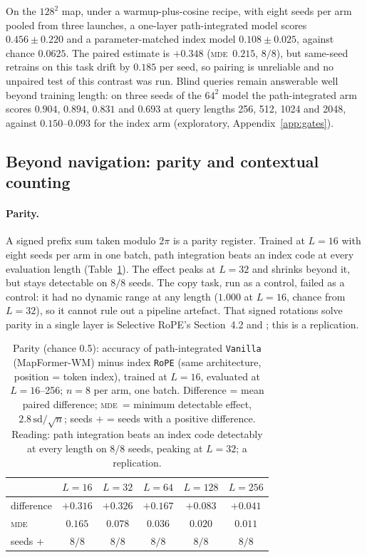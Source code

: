 \documentclass[10pt]{article}
\newcommand{\mde}{\textsc{mde}}
\newcommand{\arm}[1]{\texttt{#1}}
\begin{document}
On the $128^2$ map, under a warmup-plus-cosine recipe, with eight seeds per arm pooled from three launches,
a one-layer path-integrated model scores $0.456\pm0.220$ and a parameter-matched index model $0.108\pm0.025$,
against chance $0.0625$. The paired estimate is $+0.348$ (\mde\ $0.215$, $8/8$), but same-seed retrains on
this task drift by $0.185$ per seed, so pairing is unreliable and no unpaired test of this contrast was run.
Blind queries remain answerable well beyond training length: on three seeds of the $64^2$ model the
path-integrated arm scores $0.904$, $0.894$, $0.831$ and $0.693$ at query lengths 256, 512, 1024 and
2048, against $0.150$--$0.093$ for the index arm (exploratory, Appendix~\ref{app:gates}).

\subsection{Beyond navigation: parity and contextual counting}
\label{sec:c1-beyond}

\paragraph{Parity.} A signed prefix sum taken modulo $2\pi$ is a parity register. Trained at $L=16$
with eight seeds per arm in one batch, path integration beats an index code at every evaluation
length (Table~\ref{tab:parity}). The effect peaks at $L=32$ and shrinks beyond it, but stays detectable on $8/8$ seeds.
The copy task, run as a control, failed as a control: it had no dynamic range at any length ($1.000$ at
$L=16$, chance from $L=32$), so it cannot rule out a pipeline artefact. That signed rotations solve
parity in a single layer is Selective RoPE's Section~4.2 and \citet{grazzi2025unlocking}; this is a
replication. %

\begin{table}[t]
\centering
\small
\captionsetup{font=footnotesize,skip=4pt}
\caption{Parity (chance 0.5): accuracy of path-integrated \arm{Vanilla} (MapFormer-WM) minus index \arm{RoPE} (same architecture, position = token index), trained at $L=16$, evaluated at $L=16$--256; $n=8$ per arm, one batch. Difference = mean paired difference; \mde\ = minimum detectable effect, $2.8\,\mathrm{sd}/\sqrt{n}$; seeds $+$ = seeds with a positive difference. Reading: path integration beats an index code detectably at every length on $8/8$ seeds, peaking at $L=32$; a replication.}
\label{tab:parity}
\begin{tabular}{@{}lccccc@{}}
\toprule
 & $L=16$ & $L=32$ & $L=64$ & $L=128$ & $L=256$ \\
\midrule
difference & $+0.316$ & $+0.326$ & $+0.167$ & $+0.083$ & $+0.041$ \\
\mde       & $0.165$  & $0.078$  & $0.036$  & $0.020$  & $0.011$ \\
seeds $+$  & $8/8$    & $8/8$    & $8/8$    & $8/8$    & $8/8$ \\
\bottomrule
\end{tabular}
\end{table}
\end{document}
